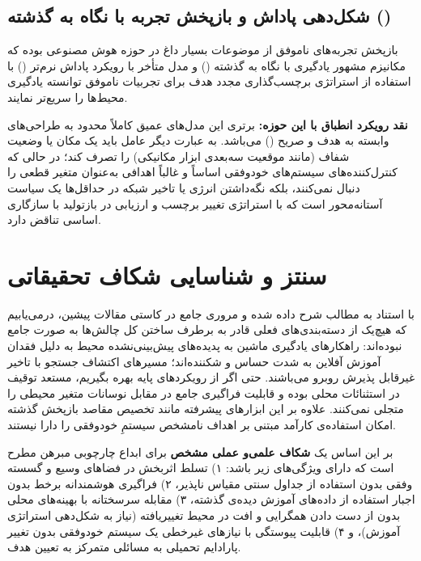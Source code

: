 \documentclass[oneside,openany,phd]{TMU-Thesis}
\begin{document}
\subsection{شکل‌دهی پاداش و بازپخش تجربه با نگاه به گذشته ()}

بازپخش تجربه‌های ناموفق از موضوعات بسیار داغ در حوزه هوش مصنوعی بوده که مکانیزم مشهور یادگیری با نگاه به گذشته () \cite{andrychowicz2017hindsight} و مدل متأخر با رویکرد پاداش نرم‌تر () \cite{he2020softher} با استفاده از استراتژی برچسب‌گذاری مجدد هدف برای تجربیات ناموفق توانسته یادگیری محیط‌ها را سریع‌تر نمایند.

\textbf{نقد رویکرد انطباق با این حوزه:} برتری این مدل‌های عمیق کاملاً محدود به طراحی‌های وابسته به هدف و صریح () می‌باشد. به عبارت دیگر عامل باید یک مکان یا وضعیت شفاف (مانند موقعیت سه‌بعدی ابزار مکانیکی) را تصرف کند؛ در حالی که کنترل‌کننده‌های سیستم‌های خودوفقی اساساً و غالباً اهدافی به‌عنوان متغیر قطعی را دنبال نمی‌کنند، بلکه نگه‌داشتن انرژی یا تاخیر شبکه در حداقل‌ها یک سیاست آستانه‌محور است که با استراتژی تغییر برچسب و ارزیابی در بازتولید  با سازگاری اساسی تناقض دارد.

\section{سنتز و شناسایی شکاف تحقیقاتی}

با استناد به مطالب شرح داده شده و مروری جامع در کاستی مقالات پیشین، درمی‌یابیم که هیچ‌یک از دسته‌بندی‌های فعلی قادر به برطرف ساختن کل چالش‌ها به صورت جامع نبوده‌اند: راهکارهای یادگیری ماشین به پدیده‌های پیش‌بینی‌نشده محیط به دلیل فقدان آموزش آفلاین به شدت حساس و شکننده‌اند؛ مسیرهای اکتشاف جستجو با تاخیر غیرقابل پذیرش روبرو می‌باشند. حتی اگر از رویکرد‌های  پایه بهره بگیریم، مستعد توقیف در استثنائات محلی بوده و قابلیت فراگیری جامع در مقابل نوسانات متغیر محیطی را متجلی نمی‌کنند. علاوه بر این ابزارهای پیشرفته مانند تخصیص مقاصد بازپخش گذشته امکان استفاده‌ی کارآمد مبتنی بر اهداف نامشخص سیستمِ خودوفقی را دارا نیستند.

بر این اساس یک \textbf{شکاف علمی‌و عملی مشخص} برای ابداع چارچوبی مبرهن مطرح است که دارای ویژگی‌های زیر باشد:
۱) تسلط اثربخش در فضاهای وسیع و گسسته وفقی بدون استفاده از جداول سنتی مقیاس ناپذیر،
۲) فراگیری هوشمندانه برخط بدون اجبار استفاده از داده‌های آموزش دیده‌ی گذشته،
۳) مقابله سرسختانه با بهینه‌های محلی بدون از دست دادن همگرایی و افت در محیط تغییریافته (نیاز به شکل‌دهی استراتژی آموزش)، و
۴) قابلیت پیوستگی با نیازهای غیرخطی یک سیستم خودوفقی بدون تغییر پارادایم تحمیلی به مسائلی متمرکز به تعیین هدف.
\end{document}
